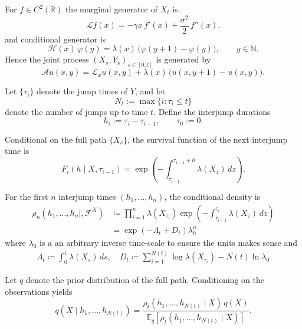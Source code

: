 \documentclass[11pt]{article}
\begin{document}
For $f\in C^2(\mathbb R)$ the marginal generator of $X_t$ is. 
\begin{equation}
\mathcal L f(x)
=
-\gamma x\, f'(x)
+
\frac{\sigma^2}{2}\, f''(x).
\end{equation}
and conditional generator is
\begin{equation}
\mathcal H(x)\,\varphi(y)
=
\lambda(x)\,\big(\varphi(y+1)-\varphi(y)\big),
\qquad y\in\mathbb N.
\end{equation}
Hence the joint process $(X_s,Y_s)_{s \in [0,t]}$ is generated by 
\begin{equation}
\mathcal A u(x,y)
=
\mathcal L_x u(x,y)
+
\lambda(x)\,\big(u(x,y+1)-u(x,y)\big).
\end{equation}




Let $\{\tau_i\}$ denote the jump times of $Y$, and let
\[
N_t := \max\{ i : \tau_i \le t\}
\]
denote the number of jumps up to time $t$.  
Define the interjump durations
\[
h_i := \tau_i - \tau_{i-1}, \qquad \tau_0:=0.
\]

Conditional on the full path $\{X_s\}$, the survival function of the next interjump time is
\begin{equation}
F_i(h\mid X,\tau_{i-1})
=
\exp\!\left(
-\int_{\tau_{i-1}}^{\tau_{i-1}+h}\lambda(X_z)\,dz
\right).
\end{equation}

For the first $n$ interjump times $(h_1,\dots,h_n)$, the conditional density is 
\begin{align}
\rho_n(h_1,\dots,h_{n}\mid ,{\mathcal F}^X)
&\coloneqq
\prod_{i=1}^{n}
\lambda(X_{\tau_i})
\exp\!\left(
-\int_{\tau_{i-1}}^{\tau_i}\lambda(X_z)\,dz
\right)
\\
&=
\exp\!\left(
-\Lambda_t
+
D_t
\right)\lambda_0^{n}
\end{align}
where $\lambda_0$ is a an arbitrary inverse time-scale to ensure the units makes sense and 
\begin{align}
\Lambda_t  \coloneqq \int_0^{t} \lambda(X_s)\,ds,\quad 
D_t \coloneqq \sum_{i=1}^{N(t)} \log \lambda(X_{\tau_i}) - N(t)\ln \lambda_0 
\end{align}


Let $q$ denote the prior distribution of the full path.  
Conditioning on the observations yields
\begin{equation}
q(X\mid h_1,\dots,h_{N(t)})
=
\frac{
\rho_t(h_1,\dots,h_{N(t)}\mid X)\,q(X)
}{
\mathbb E_q\!\left[\rho_t(h_1,\dots,h_{N(t)}\mid X)\right]
}.
\end{equation}
\end{document}
